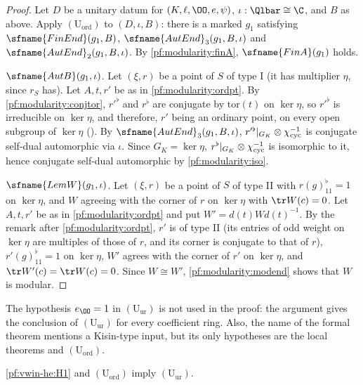 \begin{proof}
Let $D$ be a unitary datum for $(K,\ell,\OO,e,\psi)$, $\iota:\Qlbar\cong\C$, and $B$ as above. Apply
$(\mathrm{U}_{\mathrm{ord}})$ to $(D,\iota,B)$: there is a marked $g_1$ satisfying $\sfname{FinEnd}(g_1,B)$,
$\sfname{AutEnd}_3(g_1,B,\iota)$ and $\sfname{AutEnd}_2(g_1,B,\iota)$. By \cref{pf:modularity:finA},
$\sfname{FinA}(g_1)$ holds.

$\sfname{AutB}(g_1,\iota)$. Let $(\xi,r)$ be a point of $S$ of type I (it has multiplier $\eta$, since $r_S$ has). Let
$A,t,r'$ be as in \cref{pf:modularity:ordpt}. By \eqref{pf:modularity:conjtor}, $r'^\flat$ and $r^\flat$ are conjugate
by $\mathrm{tor}(t)$ on $\ker\eta$, so $r'^\flat$ is irreducible on $\ker\eta$, and therefore, $r'$ being an ordinary
point, on every open subgroup of $\ker\eta$ (). By
$\sfname{AutEnd}_3(g_1,B,\iota)$, $r'^\flat|_{G_K}\otimes\chi_{\mathrm{cyc}}^{-1}$ is conjugate self-dual automorphic via
$\iota$. Since $G_K=\ker\eta$, $r^\flat|_{G_K}\otimes\chi_{\mathrm{cyc}}^{-1}$ is isomorphic to it, hence conjugate self-dual
automorphic by \cref{pf:modularity:iso}.

$\sfname{LemW}(g_1,\iota)$. Let $(\xi,r)$ be a point of $S$ of type II with $r(g)^\flat_{11}=1$ on $\ker\eta$, and $W$
agreeing with the corner of $r$ on $\ker\eta$ with $\tr W(c)=0$. Let $A,t,r'$ be as in \cref{pf:modularity:ordpt} and
put $W'=d(t)Wd(t)^{-1}$. By the remark after \cref{pf:modularity:ordpt}, $r'$ is of type II (its entries of odd weight
on $\ker\eta$ are multiples of those of $r$, and its corner is conjugate to that of $r$), $r'(g)^\flat_{11}=1$ on
$\ker\eta$, $W'$ agrees with the corner of $r'$ on $\ker\eta$, and $\tr W'(c)=\tr W(c)=0$. Since $W\cong W'$,
\cref{pf:modularity:modend} shows that $W$ is modular.
\end{proof}

\begin{remark}\label{pf:modularity:rem-unr}
The hypothesis $e_\OO=1$ in $(\mathrm{U}_{\mathrm{ur}})$ is not used in the proof: the argument gives the conclusion of
$(\mathrm{U}_{\mathrm{ur}})$ for every coefficient ring. Also, the name of the formal theorem mentions a Kisin-type
input, but its only hypotheses are the local theorems and $(\mathrm{U}_{\mathrm{ord}})$.
\end{remark}

\begin{theorem}\label{pf:modularity:unr-main}
\ref{pf:vwin-he:H1} and $(\mathrm{U}_{\mathrm{ord}})$ imply $(\mathrm{U}_{\mathrm{ur}})$.
\end{theorem}

